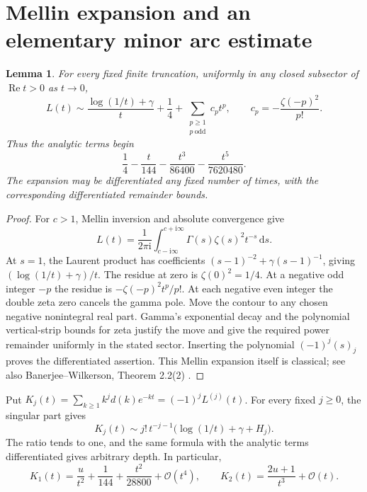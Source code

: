 \documentclass[11pt,letterpaper]{article}
\numberwithin{equation}{section}
\newtheorem{lemma}[theorem]{Lemma}
\theoremstyle{remark}
\newcommand{\dd}{\mathrm d}
\newcommand{\ii}{\mathrm i}
\newcommand{\OO}{\mathcal O}
\DeclareMathOperator{\Repart}{Re}
\begin{document}
\section{Mellin expansion and an elementary minor arc estimate}
\begin{lemma}\label{dwa:as:lem:mellin}
For every fixed finite truncation, uniformly in any closed subsector of $\Repart t>0$ as $t\to0$,
\begin{equation}\label{dwa:as:eq:mellin}
 L(t)\sim\frac{\log(1/t)+\gamma}{t}+\frac14+
 \sum_{\substack{p\ge1\\p\ \mathrm{odd}}}c_pt^p,
 \qquad c_p=-\frac{\zeta(-p)^2}{p!}.
\end{equation}
Thus the analytic terms begin
\[
 \frac14-\frac{t}{144}-\frac{t^3}{86400}-\frac{t^5}{7620480}.
\]
The expansion may be differentiated any fixed number of times, with the corresponding differentiated remainder bounds.
\end{lemma}
\begin{proof}
For $c>1$, Mellin inversion and absolute convergence give
\[
 L(t)=\frac1{2\pi\ii}\int_{c-\ii\infty}^{c+\ii\infty}
       \Gamma(s)\zeta(s)^2t^{-s}\,\dd s.
\]
At $s=1$, the Laurent product has coefficients $(s-1)^{-2}+\gamma(s-1)^{-1}$, giving $(\log(1/t)+\gamma)/t$. The residue at zero is $\zeta(0)^2=1/4$. At a negative odd integer $-p$ the residue is $-\zeta(-p)^2t^p/p!$. At each negative even integer the double zeta zero cancels the gamma pole. Move the contour to any chosen negative nonintegral real part. Gamma's exponential decay and the polynomial vertical-strip bounds for zeta justify the move and give the required power remainder uniformly in the stated sector. Inserting the polynomial $(-1)^j(s)_j$ proves the differentiated assertion. This Mellin expansion itself is classical; see also Banerjee--Wilkerson, Theorem 2.2(2) \cite{BW}.
\end{proof}

Put $K_j(t)=\sum_{k\ge1}k^jd(k)e^{-kt}=(-1)^jL^{(j)}(t)$. For every fixed $j\ge0$, the singular part gives
\begin{equation}\label{dwa:as:eq:kj}
 K_j(t)\sim j!\,t^{-j-1}\bigl(\log(1/t)+\gamma+H_j\bigr).
\end{equation}
The ratio tends to one, and the same formula with the analytic terms differentiated gives arbitrary depth. In particular,
\begin{equation}\label{dwa:as:eq:k1k2}
 K_1(t)=\frac{u}{t^2}+\frac1{144}+\frac{t^2}{28800}+\OO(t^4),
 \qquad K_2(t)=\frac{2u+1}{t^3}+\OO(t).
\end{equation}
\end{document}
